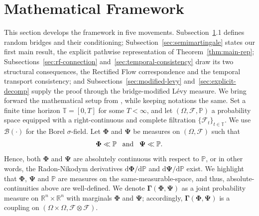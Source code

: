 \documentclass{article}
\newcommand{\levy}{{L\'evy }}
\def\R{\mathbb{R}}
\def\P{\mathbb{P}}
\def\T{\mathbb{T}}
\def\dd{\mathrm{d}}
\def\F{\mathcal{F}}
\theoremstyle{definition}
\begin{document}
\section{Mathematical Framework}\label{sec:framework}
This section develops the framework in five movements. Subsection~\ref{sec:framework}.1 defines random bridges and their conditioning; Subsection~\ref{sec:semimartingale} states our first main result, the explicit pathwise representation of Theorem~\ref{thm:main-rep}; Subsections~\ref{sec:rf-connection} and~\ref{sec:temporal-consistency} draw its two structural consequences, the Rectified Flow correspondence and the temporal transport consistency; and Subsections~\ref{sec:modified-levy} and~\ref{sec:explicit-decomp} supply the proof through the bridge-modified \levy measure.
We bring forward the mathematical setup from \cite{goria_random-bridges_2025}, while keeping notations the same. Set a finite time horizon $\T = [0,T]$ for some $T <\infty$, and let $(\Omega,\F,\P)$ a probability space equipped with a right-continuous and complete filtration $\{\F_{t}\}_{t \in \T}$. We use $\mathcal{B}(\cdot)$ for the Borel $\sigma$-field. Let $\boldsymbol{\Phi}$ and $\boldsymbol{\Psi}$ be measures on $(\Omega,\F)$ such that
\begin{align}
\boldsymbol{\Phi}\ll \P \,\,\,\,\, \text{and} \,\,\,\,\, \boldsymbol{\Psi}\ll \P. \notag
\end{align}
Hence, both $\boldsymbol{\Phi}$ and $\boldsymbol{\Psi}$ are absolutely continuous with respect to $\P$, or in other words, the Radon-Nikodym derivatives $\dd \boldsymbol{\Phi} / \dd \P$ and $\dd \boldsymbol{\Psi} / \dd \P$ exist. We highlight that $\boldsymbol{\Phi}$, $\boldsymbol{\Psi}$ and $\P$ are measures on the same-measurable-space, and thus, absolute-continuities above are well-defined. We denote $\boldsymbol{\Gamma}(\boldsymbol{\Phi},\boldsymbol{\Psi})$ as a joint probability measure on $\R^n\times\R^n$ with marginals $\boldsymbol{\Phi}$ and $\boldsymbol{\Psi}$; accordingly, $\boldsymbol{\Gamma}(\boldsymbol{\Phi},\boldsymbol{\Psi})$ is a coupling on $(\Omega \times \Omega, \F \otimes \F)$.
\end{document}

